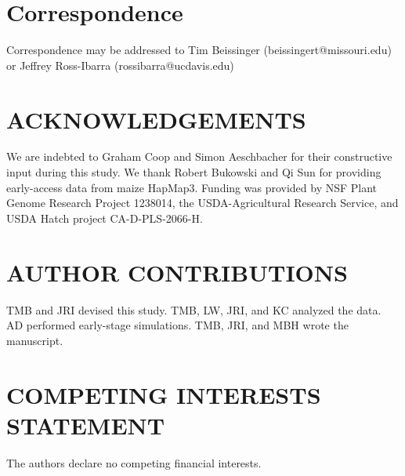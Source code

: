 \documentclass[12pt,a4paper]{article}
\begin{document}
\section*{Correspondence}
Correspondence may be addressed to Tim Beissinger (beissingert@missouri.edu) or Jeffrey Ross-Ibarra (rossibarra@ucdavis.edu)

\section*{ACKNOWLEDGEMENTS}
We are indebted to Graham Coop and Simon Aeschbacher for their constructive input during this study. We thank Robert Bukowski and Qi Sun for providing early-access data from maize HapMap3. Funding was provided by NSF Plant Genome Research Project 1238014, the USDA-Agricultural Research Service, and USDA Hatch project CA-D-PLS-2066-H.

\section*{AUTHOR CONTRIBUTIONS}
TMB and JRI devised this study. TMB, LW, JRI, and KC analyzed the data. AD performed early-stage simulations. TMB, JRI, and MBH wrote the manuscript.

\section*{COMPETING INTERESTS STATEMENT}
The authors declare no competing financial interests.


%
%

\renewcommand\refname{References (Main Text)}
\end{document}

